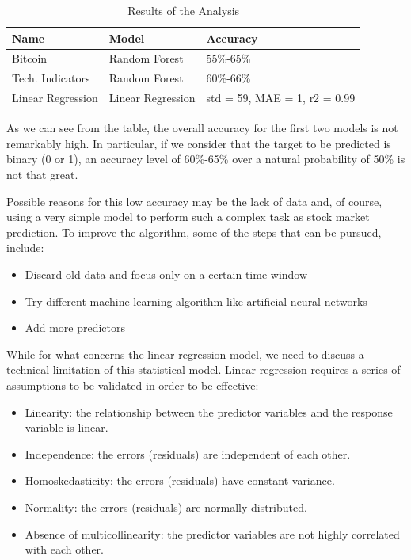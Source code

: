 \documentclass[conference,compsoc]{IEEEtran}
\begin{document}
\begin{table}[ht]
\renewcommand{\arraystretch}{1.3}
\caption{Results of the Analysis}
\label{results}
\centering
\begin{tabular}{|m{8em}|m{8em}|m{8em}|}
    \hline
    \textbf{Name} & \textbf{Model} & \textbf{Accuracy}\\
    \hline
    Bitcoin & Random Forest & 55\%-65\% \\
    \hline
    Tech. Indicators & Random Forest & 60\%-66\% \\
    \hline
    Linear Regression & Linear Regression & std = 59, MAE = 1, r2 = 0.99 \\
    \hline
\end{tabular}
\end{table}

As we can see from the table, the overall accuracy for the first two models is not remarkably high.
%
In particular, if we consider that the target to be predicted is binary (0 or 1), an accuracy level of 60\%-65\% over a natural probability of 50\% is not that great.

Possible reasons for this low accuracy may be the lack of data and, of course, using a very simple model to perform such a complex task as stock market prediction.
%
To improve the algorithm, some of the steps that can be pursued, include:

\begin{itemize}
    \item Discard old data and focus only on a certain time window
    \item Try different machine learning algorithm like artificial neural networks
    \item Add more predictors 
\end{itemize}

While for what concerns the linear regression model, we need to discuss a technical limitation of this statistical model.
%
Linear regression requires a series of assumptions to be validated in order to be effective:

\begin{itemize}
    \item Linearity: the relationship between the predictor variables and the response variable is linear.
    \item Independence: the errors (residuals) are independent of each other.
    \item Homoskedasticity: the errors (residuals) have constant variance.
    \item Normality: the errors (residuals) are normally distributed.
    \item Absence of multicollinearity: the predictor variables are not highly correlated with each other.
\end{itemize}
\end{document}
